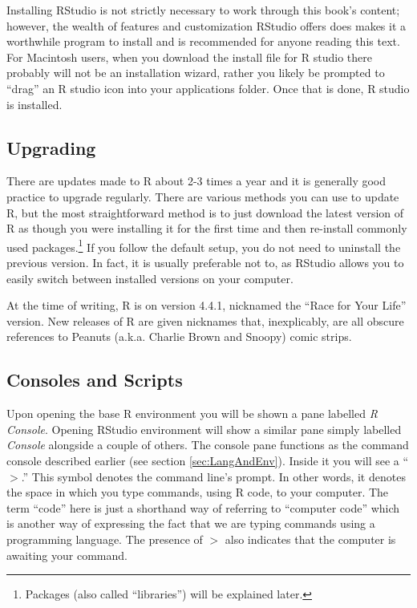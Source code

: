 Installing RStudio is not strictly necessary to work through this book's content; however, the wealth of features and customization RStudio offers does makes it a worthwhile program to install and is recommended for anyone reading this text. For Macintosh users, when you download the install file for R studio there probably will not be an installation wizard, rather you likely be prompted to ``drag'' an R studio icon into your applications folder. Once that is done, R studio is installed.

\subsection{Upgrading}

There are updates made to R about 2-3 times a year and it is generally good practice to upgrade regularly. There are various methods you can use to update R, but the most straightforward method is to just download the latest version of R as though you were installing it for the first time and then re-install commonly used packages.\footnote{Packages (also called ``libraries'') will be explained later.} If you follow the default setup, you do not need to uninstall the previous version. In fact, it is usually preferable not to, as RStudio allows you to easily switch between installed versions on your computer.

At the time of writing, R is on version 4.4.1, nicknamed the ``Race for Your Life'' version.  New releases of R are given nicknames that, inexplicably, are all obscure references to Peanuts (a.k.a. Charlie Brown and Snoopy) comic strips.

\subsection{Consoles and Scripts}

Upon opening the base R environment you will be shown a pane labelled \textit{R Console}.  Opening RStudio environment will show a similar pane simply labelled \textit{Console} alongside a couple of others.  The console pane functions as the command console described earlier (see section \ref{sec:LangAndEnv}).  Inside it you will see a ``$>$.'' This symbol denotes the command line's prompt.  In other words, it denotes the space in which you type commands, using R code, to your computer.  The term ``code'' here is just a shorthand way of referring to ``computer code'' which is another way of expressing the fact that we are typing commands using a programming language. The presence of $>$ also indicates that the computer is awaiting your command.

